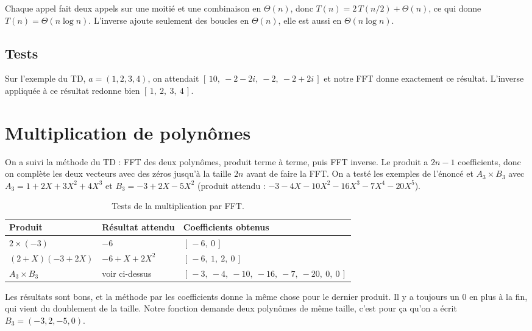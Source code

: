 \documentclass[11pt,a4paper]{article}
\begin{document}
Chaque appel fait deux appels sur une moitié et une combinaison en $\Theta(n)$, donc
$T(n) = 2\,T(n/2) + \Theta(n)$, ce qui donne $T(n) = \Theta(n \log n)$. L'inverse
ajoute seulement des boucles en $\Theta(n)$, elle est aussi en $\Theta(n \log n)$.

\subsection{Tests}

Sur l'exemple du TD, $a = (1, 2, 3, 4)$, on attendait $[\,10,\ -2-2i,\ -2,\ -2+2i\,]$
et notre FFT donne exactement ce résultat. L'inverse appliquée à ce résultat redonne bien
$[\,1,\ 2,\ 3,\ 4\,]$.

\section{Multiplication de polynômes}

On a suivi la méthode du TD : FFT des deux polynômes, produit terme à terme, puis FFT
inverse. Le produit a $2n-1$ coefficients, donc on complète les deux vecteurs avec des
zéros jusqu'à la taille $2n$ avant de faire la FFT. On a testé les exemples de
l'énoncé et $A_3 \times B_3$ avec $A_3 = 1 + 2X + 3X^2 + 4X^3$ et
$B_3 = -3 + 2X - 5X^2$ (produit attendu : $-3 - 4X - 10X^2 - 16X^3 - 7X^4 - 20X^5$).

\begin{table}[H]
\centering
\caption{Tests de la multiplication par FFT.}
\label{tab:mult}
\begin{tabular}{|l|l|l|}
\hline
\textbf{Produit} & \textbf{Résultat attendu} & \textbf{Coefficients obtenus} \\
\hline
$2 \times (-3)$ & $-6$ & $[\,-6,\ 0\,]$ \\
\hline
$(2 + X)(-3 + 2X)$ & $-6 + X + 2X^2$ & $[\,-6,\ 1,\ 2,\ 0\,]$ \\
\hline
$A_3 \times B_3$ & voir ci-dessus &
  $[\,-3,\ -4,\ -10,\ -16,\ -7,\ -20,\ 0,\ 0\,]$ \\
\hline
\end{tabular}
\end{table}

Les résultats sont bons, et la méthode par les coefficients donne la même chose pour
le dernier produit. Il y a toujours un 0 en plus à la fin, qui vient du doublement de
la taille. Notre fonction demande deux polynômes de même taille, c'est pour ça qu'on
a écrit $B_3 = (-3, 2, -5, 0)$.
\end{document}
